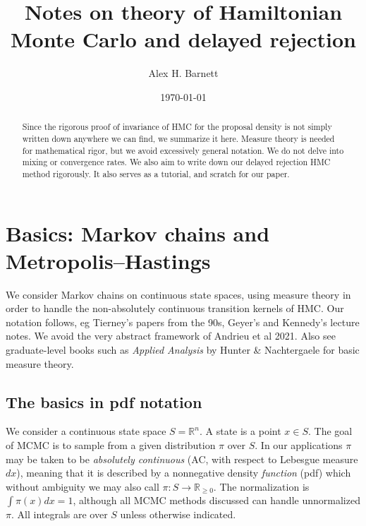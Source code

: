 \documentclass[10pt]{article}
\newcommand{\R}{\mathbb{R}}
\begin{document}
\title{Notes on theory of Hamiltonian Monte Carlo and delayed rejection}


\author{Alex H. Barnett}
\date{\today}
\maketitle

\begin{abstract}
  Since the rigorous proof of invariance of HMC for the proposal density
  is not simply written
  down anywhere we can find, we summarize it here.
  Measure theory is needed for mathematical rigor, but we avoid
  excessively general notation.
  We do not delve into mixing or convergence rates.
  We also aim to write down our delayed rejection HMC method rigorously.
  It also serves as a tutorial,
  and scratch for our paper.
\end{abstract}



\section{Basics: Markov chains and Metropolis--Hastings}

We consider Markov chains on continuous
state spaces, using measure theory in order to handle the non-absolutely
continuous transition kernels of HMC.
Our notation follows, eg Tierney's papers from the 90s, Geyer's and Kennedy's lecture notes.
We avoid the very abstract framework of Andrieu et al 2021.
Also see graduate-level books such as {\em Applied Analysis} by Hunter \& Nachtergaele for basic measure theory.

\subsection{The basics in pdf notation}

We consider a continuous state space $S = \R^n$.
A state is a point $x\in S$.
The goal of MCMC is to sample from a given distribution $\pi$ over $S$.
In our applications $\pi$ may be taken to be
{\em absolutely continuous} (AC, with respect to
Lebesgue measure $dx$), meaning that it is described by a nonnegative
density {\em function} (pdf) which without ambiguity we may also call
$\pi: S \to \R_{\ge 0}$.
The normalization is $\int \pi(x) dx = 1$, although all MCMC methods
discussed can handle unnormalized $\pi$.
All integrals are over $S$ unless otherwise indicated.
\end{document}
